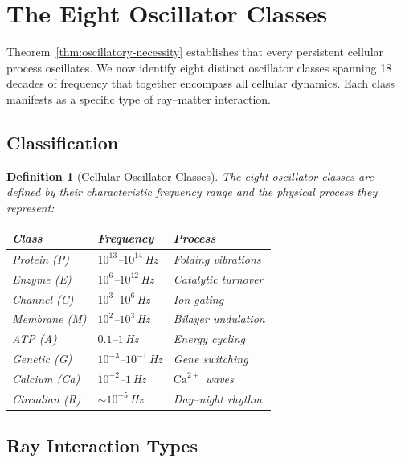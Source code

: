 \documentclass[11pt,twocolumn,a4paper]{article}
\newtheorem{definition}[theorem]{Definition}
\begin{document}
\section{The Eight Oscillator Classes}
\label{sec:oscillator-classes}

Theorem~\ref{thm:oscillatory-necessity} establishes that every
persistent cellular process oscillates. We now identify eight distinct
oscillator classes spanning 18 decades of frequency that together
encompass all cellular dynamics. Each class manifests as a specific
type of ray--matter interaction.

\subsection{Classification}

\begin{definition}[Cellular Oscillator Classes]
\label{def:oscillator-classes}
The eight oscillator classes are defined by their characteristic
frequency range and the physical process they represent:

\begin{center}
\small
\begin{tabularx}{\columnwidth}{@{}lll@{}}
\toprule
\textbf{Class} & \textbf{Frequency} & \textbf{Process} \\
\midrule
Protein (P) & $10^{13}$--$10^{14}$\,Hz & Folding vibrations \\
Enzyme (E) & $10^{6}$--$10^{12}$\,Hz & Catalytic turnover \\
Channel (C) & $10^{3}$--$10^{6}$\,Hz & Ion gating \\
Membrane (M) & $10^{2}$--$10^{3}$\,Hz & Bilayer undulation \\
ATP (A) & $0.1$--$1$\,Hz & Energy cycling \\
Genetic (G) & $10^{-3}$--$10^{-1}$\,Hz & Gene switching \\
Calcium (Ca) & $10^{-2}$--$1$\,Hz & $\text{Ca}^{2+}$ waves \\
Circadian (R) & $\sim\!10^{-5}$\,Hz & Day--night rhythm \\
\bottomrule
\end{tabularx}
\end{center}
\end{definition}

\subsection{Ray Interaction Types}
\end{document}
